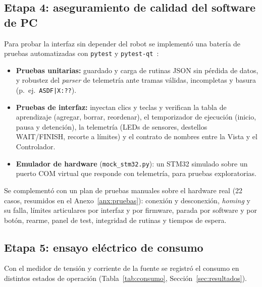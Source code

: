 \subsection{Etapa 4: aseguramiento de calidad del software de PC}
Para probar la interfaz sin depender del robot se implementó una batería de pruebas
automatizadas con \texttt{pytest} y \texttt{pytest-qt}~\cite{pytestqt}:
\begin{itemize}
  \item \textbf{Pruebas unitarias:} guardado y carga de rutinas JSON sin pérdida de datos, y
        robustez del \emph{parser} de telemetría ante tramas válidas, incompletas y basura
        (p.~ej.\ \texttt{ASDF|X:??}).
  \item \textbf{Pruebas de interfaz:} inyectan clics y teclas y verifican la tabla de
        aprendizaje (agregar, borrar, reordenar), el temporizador de ejecución (inicio, pausa y
        detención), la telemetría (LEDs de sensores, destellos WAIT/FINISH, recorte a límites) y
        el contrato de nombres entre la Vista y el Controlador.
  \item \textbf{Emulador de hardware} (\texttt{mock\_stm32.py}): un STM32 simulado sobre un
        puerto COM virtual que responde con telemetría, para pruebas exploratorias.
\end{itemize}
Se complementó con un plan de pruebas manuales sobre el hardware real (22 casos, resumidos en
el Anexo~\ref{anx:pruebas}): conexión y desconexión, \emph{homing} y su falla, límites
articulares por interfaz y por firmware, parada por software y por botón, rearme, panel de
test, integridad de rutinas y tiempos de espera.

\subsection{Etapa 5: ensayo eléctrico de consumo}
Con el medidor de tensión y corriente de la fuente se registró el consumo en distintos
estados de operación (Tabla~\ref{tab:consumo}, Sección~\ref{sec:resultados}).
